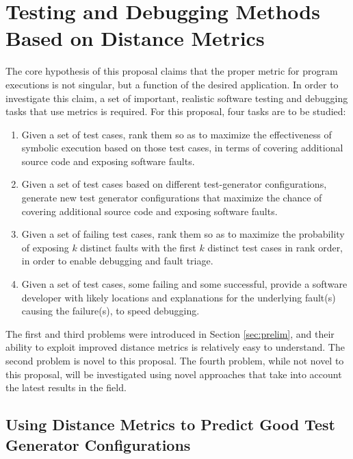 \section{Testing and Debugging Methods Based on Distance Metrics}

The core hypothesis of this proposal claims that the proper metric for
program executions is not singular, but a function of the desired
application. In order to investigate this claim, a set of important,
realistic software testing and debugging tasks that use metrics is
required.  For this proposal, four tasks are to be studied:

\begin{enumerate}
\item Given a set of test cases, rank them so as to maximize the effectiveness of symbolic execution based on those test cases, in terms of covering additional source code and exposing software faults.
\item Given a set of test cases based on different test-generator configurations, generate new test generator configurations that maximize the chance of covering additional source code and exposing software faults.
\item Given a set of failing test cases, rank them so as to maximize the probability of exposing $k$ distinct faults with the first $k$ distinct test cases in rank order, in order to enable debugging and fault triage.
\item Given a set of test cases, some failing and some successful, provide a software developer with likely locations and explanations for the underlying fault(s) causing the failure(s), to speed debugging.
\end{enumerate}

The first and third problems were introduced in Section
\ref{sec:prelim}, and their ability to exploit improved distance
metrics is relatively easy to understand.  The second problem is novel
to this proposal.  The fourth problem, while not novel to this
proposal, will be investigated using novel approaches that take into account the latest results in the field.

\subsection{Using Distance Metrics to Predict Good Test Generator Configurations}
\label{sec:gen}


